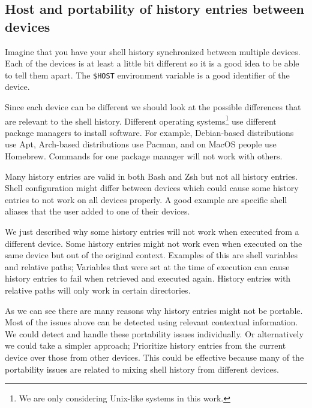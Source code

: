 \documentclass[thesis=M,english]{FITthesis}[2012/10/20]
\begin{document}

\subsection{Host and portability of history entries between devices}

Imagine that you have your shell history synchronized between multiple devices.
Each of the devices is at least a little bit different so it is a good idea to be able to tell them apart. The \verb|$HOST| environment variable is a good identifier of the device. 

Since each device can be different we should look at the possible differences that are relevant to the shell history. Different operating systems\footnote{We are only considering Unix-like systems in this work.} use different package managers to install software. For example, Debian-based distributions use Apt, Arch-based distributions use Pacman, and on MacOS people use Homebrew. Commands for one package manager will not work with others.

Many history entries are valid in both Bash and Zsh but not all history entries. Shell configuration might differ between devices which could cause some history entries to not work on all devices properly. A good example are specific shell aliases that the user added to one of their devices.


We just described why some history entries will not work when executed from a different device. Some history entries might not work even when executed on the same device but out of the original context. Examples of this are shell variables and relative paths; Variables that were set at the time of execution can cause history entries to fail when retrieved and executed again. History entries with relative paths will only work in certain directories.

As we can see there are many reasons why history entries might not be portable. Most of the issues above can be detected using relevant contextual information. 
We could detect and handle these portability issues individually. Or alternatively we could take a simpler approach; Prioritize history entries from the current device over those from other devices. This could be effective because many of the portability issues are related to mixing shell history from different devices. 
\end{document}
